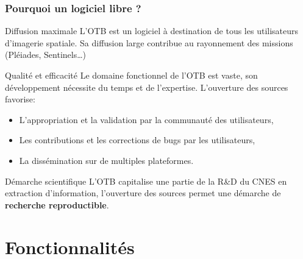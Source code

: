 \documentclass[8pt]{beamer}
\begin{document}
\begin{frame}
\frametitle{Pourquoi un logiciel libre ?}

\begin{block}{Diffusion maximale}
L'OTB est un logiciel à destination de tous les utilisateurs d'imagerie
spatiale. Sa diffusion large contribue au rayonnement des missions (Pléiades, Sentinels\ldots)
\end{block}

\begin{block}{Qualité et efficacité}
Le domaine fonctionnel de l'OTB est vaste, son développement nécessite du temps
et de l'expertise. L'ouverture des sources favorise:
\begin{itemize}
\item L'appropriation et la validation par la communauté des utilisateurs,
\item Les contributions et les corrections de bugs par les utilisateurs,
\item La dissémination sur de multiples plateformes.
\end{itemize}
\end{block}

\begin{block}{Démarche scientifique}
L'OTB capitalise une partie de la R\&D du CNES en extraction d'information, l'ouverture des sources permet une démarche de \textbf{recherche reproductible}.
\end{block}

\end{frame}

\section{Fonctionnalités}
\end{document}
